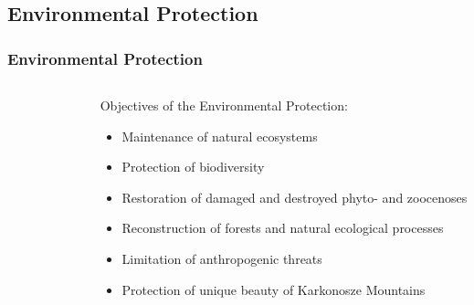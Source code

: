 \documentclass[pdflatex,compress,8pt,
	xcolor={dvipsnames,dvipsnames,svgnames,x11names,table},
	hyperref={colorlinks = true,
	breaklinks = true, urlcolor = NavyBlue, breaklinks = true}]{beamer}
\begin{document}
\subsection{Environmental Protection}
\begin{frame}\frametitle{Environmental Protection}
\begin{minipage}[0.4\textheight]{\textwidth}
\begin{columns}[T]
\begin{column}{0.5\textwidth}
\begin{figure}[H]
	\centering
			\hspace{5mm}
			\vspace{3mm}
			\hspace{5mm}

\end{figure}
\end{column}
\begin{column}{0.5\textwidth}
\vspace{4em} 
Objectives of the Environmental Protection:
\begin{itemize}
	\item Maintenance of natural ecosystems 
	\item Protection of biodiversity 
	\item Restoration of damaged and destroyed phyto- and zoocenoses
	\item Reconstruction of forests and natural ecological processes
	\item Limitation of anthropogenic threats
	\item Protection of unique beauty of Karkonosze Mountains
\end{itemize}
\end{column}
\end{columns}
\end{minipage}
\end{frame}
\end{document}
